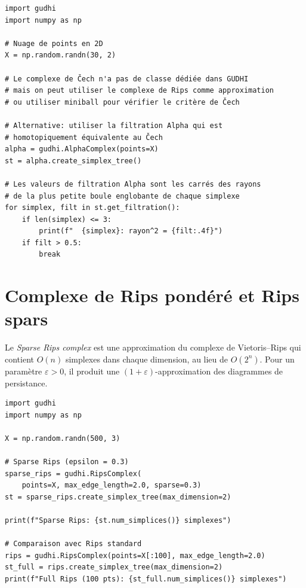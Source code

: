 \begin{codeblock}[title=\textbf{Complexe de \v{C}ech avec GUDHI}]
\begin{verbatim}
import gudhi
import numpy as np

# Nuage de points en 2D
X = np.random.randn(30, 2)

# Le complexe de Čech n'a pas de classe dédiée dans GUDHI
# mais on peut utiliser le complexe de Rips comme approximation
# ou utiliser miniball pour vérifier le critère de Čech

# Alternative: utiliser la filtration Alpha qui est
# homotopiquement équivalente au Čech
alpha = gudhi.AlphaComplex(points=X)
st = alpha.create_simplex_tree()

# Les valeurs de filtration Alpha sont les carrés des rayons
# de la plus petite boule englobante de chaque simplexe
for simplex, filt in st.get_filtration():
    if len(simplex) <= 3:
        print(f"  {simplex}: rayon^2 = {filt:.4f}")
    if filt > 0.5:
        break
\end{verbatim}
\end{codeblock}

\section{Complexe de Rips pondéré et Rips spars}

\begin{definition}
Le \emph{Sparse Rips complex} est une approximation du complexe de
Vietoris--Rips qui contient $O(n)$ simplexes dans chaque dimension, au
lieu de $O(2^n)$. Pour un param\`etre $\varepsilon > 0$, il produit
une $(1+\varepsilon)$-approximation des diagrammes de persistance.
\end{definition}

\begin{codeblock}[title=\textbf{Sparse Rips avec GUDHI}]
\begin{verbatim}
import gudhi
import numpy as np

X = np.random.randn(500, 3)

# Sparse Rips (epsilon = 0.3)
sparse_rips = gudhi.RipsComplex(
    points=X, max_edge_length=2.0, sparse=0.3)
st = sparse_rips.create_simplex_tree(max_dimension=2)

print(f"Sparse Rips: {st.num_simplices()} simplexes")

# Comparaison avec Rips standard
rips = gudhi.RipsComplex(points=X[:100], max_edge_length=2.0)
st_full = rips.create_simplex_tree(max_dimension=2)
print(f"Full Rips (100 pts): {st_full.num_simplices()} simplexes")
\end{verbatim}
\end{codeblock}

